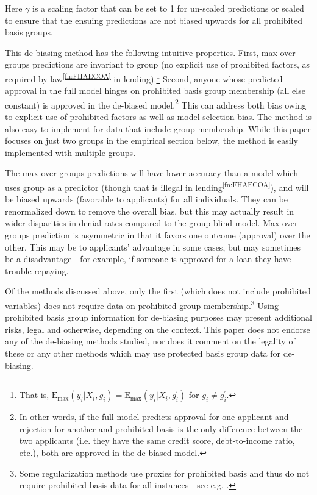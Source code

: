 Here $\gamma$ is a scaling factor that can be set to 1 for un-scaled predictions or scaled to ensure that the ensuing predictions are not biased upwards for all prohibited basis groups.

This de-biasing method has the following intuitive properties. First, max-over-groups predictions are invariant to group (no explicit use of prohibited factors, as required by law\textsuperscript{\ref{fn:FHAECOA}} in lending).\footnote{That is, $\text{E}_{\text{max}} \left(y_i\vert X_i,g_i\right) = \text{E}_{\text{max}} \left(y_i\vert X_i,g_i^\prime\right)$ for $g_i\neq g_i^\prime$.} Second, anyone whose predicted approval in the full model hinges on prohibited basis group membership (all else constant) is approved in the de-biased model.\footnote{In other words, if the full model predicts approval for one applicant and rejection for another and prohibited basis is the only difference between the two applicants (i.e. they have the same credit score, debt-to-income ratio, etc.), both are approved in the de-biased model.} This can address both bias owing to explicit use of prohibited factors as well as model selection bias. The method is also easy to implement for data that include group membership. While this paper focuses on just two groups in the empirical section below, the method is easily implemented with multiple groups. 


The max-over-groups predictions will have lower accuracy than a model which uses group as a predictor (though that is illegal in lending\textsuperscript{\ref{fn:FHAECOA}}), and will be biased upwards (favorable to applicants) for all individuals. They can be renormalized down to remove the overall bias, but this may actually result in wider disparities in denial rates compared to the group-blind model. Max-over-groups prediction is asymmetric in that it favors one outcome (approval) over the other. This may be to applicants' advantage in some cases, but may sometimes be a disadvantage---for example, if someone is approved for a loan they have trouble repaying.



Of the methods discussed above, only the first (which does not include prohibited variables) does not require data on prohibited group membership.\footnote{Some regularization methods use proxies for prohibited basis and thus do not require prohibited basis data for all instances---see e.g. .} Using prohibited basis group information for de-biasing purposes may present additional risks, legal and otherwise, depending on the context. This paper does not endorse any of the de-biasing methods studied, nor does it comment on the legality of these or any other methods which may use protected basis group data for de-biasing.


